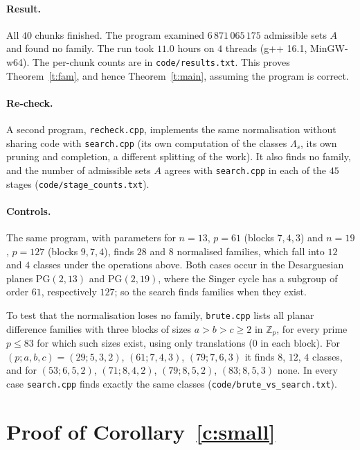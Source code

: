 \documentclass[11pt,a4paper]{article}
\theoremstyle{remark}
\newcommand{\ZZ}{\mathbb{Z}}
\begin{document}
\paragraph{Result.} All $40$ chunks finished. The program examined $6\,871\,065\,175$ admissible sets $A$ and found no family. The run took $11.0$ hours on $4$ threads (g++ 16.1, MinGW-w64). The per-chunk counts are in \texttt{code/results.txt}. This proves Theorem~\ref{t:fam}, and hence Theorem~\ref{t:main}, assuming the program is correct.

\paragraph{Re-check.} A second program, \texttt{recheck.cpp}, implements the same normalisation without sharing code with \texttt{search.cpp} (its own computation of the classes $\Lambda_s$, its own pruning and completion, a different splitting of the work). It also finds no family, and the number of admissible sets $A$ agrees with \texttt{search.cpp} in each of the $45$ stages (\texttt{code/stage\_counts.txt}).

\paragraph{Controls.} The same program, with parameters for $n=13$, $p=61$ (blocks $7,4,3$) and $n=19$, $p=127$ (blocks $9,7,4$), finds $28$ and $8$ normalised families, which fall into $12$ and $4$ classes under the operations above. Both cases occur in the Desarguesian planes $\mathrm{PG}(2,13)$ and $\mathrm{PG}(2,19)$, where the Singer cycle has a subgroup of order $61$, respectively $127$; so the search finds families when they exist.

To test that the normalisation loses no family, \texttt{brute.cpp} lists all planar difference families with three blocks of sizes $a>b>c\ge2$ in $\ZZ_p$, for every prime $p\le83$ for which such sizes exist, using only translations ($0$ in each block). For $(p;a,b,c)=(29;5,3,2)$, $(61;7,4,3)$, $(79;7,6,3)$ it finds $8$, $12$, $4$ classes, and for $(53;6,5,2)$, $(71;8,4,2)$, $(79;8,5,2)$, $(83;8,5,3)$ none. In every case \texttt{search.cpp} finds exactly the same classes (\texttt{code/brute\_vs\_search.txt}).

\section{Proof of Corollary~\ref{c:small}}
\end{document}
